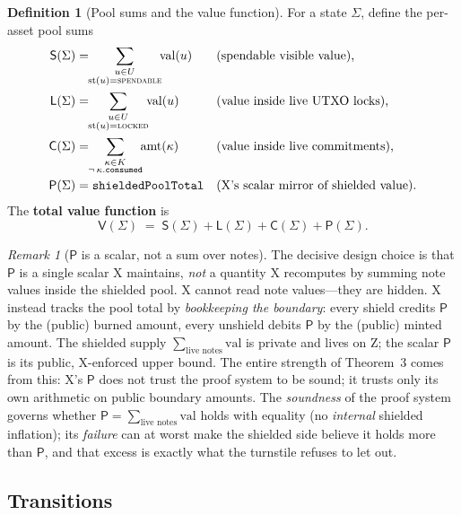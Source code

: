 \documentclass[11pt]{article}
\theoremstyle{definition}
\newtheorem{definition}{Definition}
\theoremstyle{remark}
\newtheorem{remark}{Remark}
\newcommand{\Val}{\mathsf{V}}
\newcommand{\spend}{\mathsf{S}}
\newcommand{\lock}{\mathsf{L}}
\newcommand{\commit}{\mathsf{C}}
\newcommand{\pool}{\mathsf{P}}
\begin{document}
\begin{definition}[Pool sums and the value function]
\label{def:V}
For a state $\Sigma$, define the per-asset pool sums
\begin{align*}
\spend(\Sigma) &= \!\!\sum_{\substack{u\in U\\ \mathrm{st}(u)=\textsc{spendable}}}\!\!\mathrm{val}(u)
  &&\text{(spendable visible value),}\\
\lock(\Sigma) &= \!\!\sum_{\substack{u\in U\\ \mathrm{st}(u)=\textsc{locked}}}\!\!\mathrm{val}(u)
  &&\text{(value inside live UTXO locks),}\\
\commit(\Sigma) &= \!\!\sum_{\substack{\kappa\in K\\ \neg\,\kappa.\texttt{consumed}}}\!\!\mathrm{amt}(\kappa)
  &&\text{(value inside live commitments),}\\
\pool(\Sigma) &= \texttt{shieldedPoolTotal}
  &&\text{(X's scalar mirror of shielded value).}
\end{align*}
The \textbf{total value function} is
\[
  \Val(\Sigma) \;=\; \spend(\Sigma) + \lock(\Sigma) + \commit(\Sigma) + \pool(\Sigma).
\]
\end{definition}

\begin{remark}[$\pool$ is a scalar, not a sum over notes]
\label{rem:scalar}
The decisive design choice is that $\pool$ is a single scalar X maintains,
\emph{not} a quantity X recomputes by summing note values inside the
shielded pool. X cannot read note values---they are hidden. X instead
tracks the pool total by \emph{bookkeeping the boundary}: every shield
credits $\pool$ by the (public) burned amount, every unshield debits
$\pool$ by the (public) minted amount. The shielded supply
$\sum_{\text{live notes}}\mathrm{val}$ is private and lives on Z; the
scalar $\pool$ is its public, X-enforced upper bound. The entire strength
of Theorem~3 comes from this: X's $\pool$ does not trust the proof system
to be sound; it trusts only its own arithmetic on public boundary
amounts. The \emph{soundness} of the proof system governs whether
$\pool=\sum_{\text{live notes}}\mathrm{val}$ holds with equality
(no \emph{internal} shielded inflation); its \emph{failure} can at worst
make the shielded side believe it holds more than $\pool$, and that excess
is exactly what the turnstile refuses to let out.
\end{remark}

\subsection{Transitions}
\label{sec:transitions}
\end{document}
